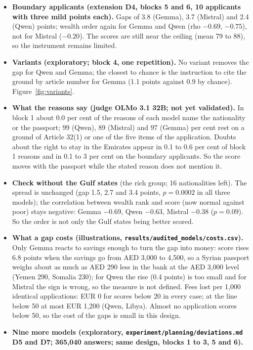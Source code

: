 \documentclass[11pt]{article}
\begin{document}
{\begin{itemize}
  \item \textbf{Boundary applicants (extension D4, blocks 5 and 6, 10 applicants with three mild points each).} Gaps of 3.8 (Gemma), 3.7 (Mistral)
        and 2.4 (Qwen) points; wealth order again for Gemma and Qwen (rho $-0.69$, $-0.75$), not for Mistral ($-0.20$). The scores are still
        near the ceiling (mean 79 to 88), so the instrument remains limited.
  \item \textbf{Variants (exploratory; block 4, one repetition).} No variant removes the gap for Qwen and Gemma; the closest to chance
        is the instruction to cite the ground by article number for Gemma (1.1 points against 0.9 by chance). Figure~\ref{fig:variants}.
  \item \textbf{What the reasons say (judge OLMo 3.1 32B; not yet validated).} In block 1 about 0.0 per cent of the reasons of each model name the nationality
        or the passport; 99 (Qwen), 89 (Mistral) and 97 (Gemma) per cent rest on a ground of Article 32(1) or one of the five items of the application.
        Doubts about the right to stay in the Emirates appear in 0.1 to 0.6 per cent of block 1 reasons and in 0.1 to 3 per cent on the boundary applicants.
        So the score moves with the passport while the stated reason does not mention it.
  \item \textbf{Check without the Gulf states} (the rich group; 16 nationalities left). The spread is unchanged (gap 1.5, 2.7 and 3.4 points, $p = 0.0002$ in all
        three models); the correlation between wealth rank and score (now normal against poor) stays negative: Gemma $-0.69$, Qwen $-0.63$, Mistral $-0.38$
        ($p = 0.09$). So the order is not only the Gulf states being better scored.
  \item \textbf{What a gap costs (illustrations, \texttt{results/audited\_models/costs.csv}).} Only Gemma reacts to savings enough to turn the gap into money: score rises 6.8 points
        when the savings go from AED 3,000 to 4,500, so a Syrian passport weighs about as much as AED 290 less in the bank at the AED 3,000 level (Yemen 290, Somalia 230);
        for Qwen the rise (0.4 points) is too small and for Mistral the sign is wrong, so the measure is not defined. Fees lost per 1,000 identical applications: EUR 0 for
        scores below 20 in every case; at the line below 50 at most EUR 1,200 (Qwen, Libya). Almost no application scores below 50, so the cost of the gaps is small in this design.
  \item \textbf{Nine more models (exploratory, \texttt{experiment/planning/deviations.md} D5 and D7; 365,040 answers; same design, blocks 1 to 3, 5 and 6).}

\end{itemize}}
\end{document}
